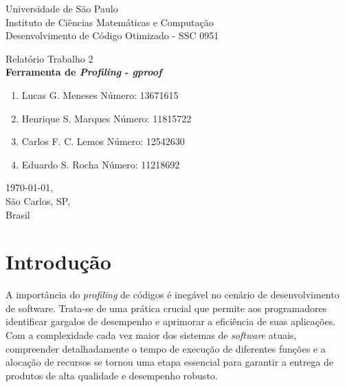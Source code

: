 \documentclass[12pt,a4paper]{article}
\begin{document}

\thispagestyle{empty}
\begin{minipage}{\textwidth}\centering
Universidade de São Paulo \\
Instituto de Ciências Matemáticas e Computação \\
Desenvolvimento de Código Otimizado - SSC 0951 \\
\end{minipage}

\vspace{5cm}

\begin{minipage}{\textwidth}\centering
\Large Relatório Trabalho 2  \\
\vspace{2cm}
\Large \textbf{Ferramenta de \textit{Profiling} - \textit{gproof}}
\end{minipage}

\vspace{3cm}

\begin{minipage}{\linewidth}\centering
\begin{enumerate}
     \item Lucas G. Meneses   \space \space \space \space \space \space  Número: 13671615
      \item Henrique S. Marques  \space \space Número: 11815722
      \item Carlos F. C. Lemos  \space \space \space \space Número: 12542630
      \item Eduardo S. Rocha  \space \space \space \space \space \space Número: 11218692
\end{enumerate}
\end{minipage}

\vfill

\begin{minipage}{\linewidth}
\centering\today, \\
São Carlos, SP, \\
Brasil
\end{minipage}

\clearpage
\thispagestyle{empty}

\tableofcontents

\section{Introdução}

A importância do \textit{profiling} de códigos é inegável no cenário de desenvolvimento de software. Trata-se de uma prática crucial que permite aos programadores identificar gargalos de desempenho e aprimorar a eficiência de suas aplicações. Com a complexidade cada vez maior dos sistemas de \textit{software} atuais, compreender detalhadamente o tempo de execução de diferentes funções e a alocação de recursos se tornou uma etapa essencial para garantir a entrega de produtos de alta qualidade e desempenho robusto.
\end{document}
